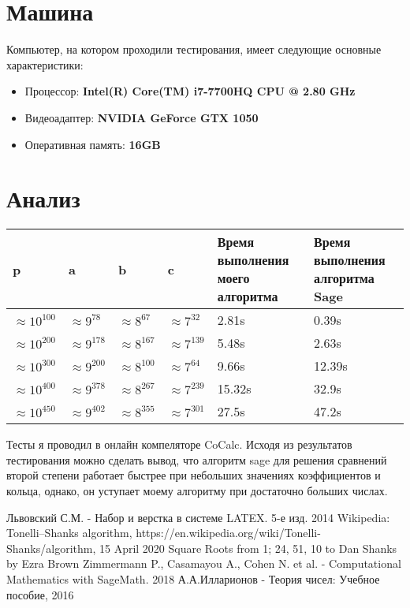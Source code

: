 \documentclass[11pt]{article}
\begin{document}
	\section{Машина}
	Компьютер, на котором проходили тестирования, имеет следующие основные характеристики:
	\begin{itemize}
		\item Процессор: \textbf{Intel(R) Core(TM) i7-7700HQ CPU @ 2.80 GHz}
			\item Видеоадаптер: \textbf{NVIDIA GeForce GTX 1050}
			\item Оперативная память: \textbf{16GB}
		\end{itemize}
		\section{Анализ}
		
		\begin{tabular}{|p{2cm}|p{2cm}|p{2cm}|p{2cm}|p{3.5cm}|p{3.5cm}|}
			\hline
			p & a & b & c & Время выполнения моего алгоритма & Время выполнения алгоритма Sage\\
			\hline
			$\approx 10^{100}$ &$\approx9^{78}$ &$\approx8^{67}$ & $\approx7^{32}$ & 2.81s & 0.39s\\
			$\approx10^{200}$ &$\approx9^{178}$ &$\approx8^{167}$ & $\approx7^{139}$ & 5.48s & 2.63s\\
			$\approx10^{300}$ & $\approx9^{200}$&$\approx8^{100}$ & $\approx7^{64}$ & 9.66s & 12.39s\\
			$\approx10^{400}$ &$\approx9^{378}$ &$\approx8^{267}$ & $\approx7^{239}$ & 15.32s & 32.9s\\
		    $\approx10^{450}$&$\approx9^{402}$ &$\approx8^{355}$ & $\approx7^{301}$ & 27.5s & 47.2s\\
			\hline
		\end{tabular}
		
		Тесты я проводил в онлайн компеляторе CoCalc. Исходя из результатов тестирования можно сделать вывод, что алгоритм sage для решения сравнений второй степени работает быстрее при небольших значениях коэффициентов и кольца, однако, он уступает моему алгоритму при достаточно больших числах.
		
\begin{thebibliography}{5}		
			 Львовский С.М. - Набор и верстка в системе LATEX. 5-е изд. 2014
				Wikipedia: Tonelli–Shanks algorithm, https://en.wikipedia.org/wiki/Tonelli-Shanks/algorithm, 15 April 2020
			 Square Roots from 1; 24, 51, 10 to Dan Shanks by Ezra Brown
			 Zimmermann P., Casamayou A., Cohen N. et al. - Computational Mathematics with SageMath. 2018
			 А.А.Илларионов - Теория чисел: Учебное пособие, 2016
\end{thebibliography}
\end{document}
